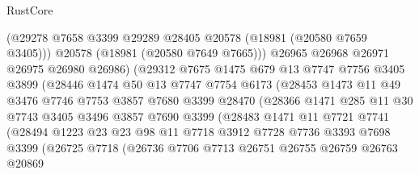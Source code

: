 \begin{lexlean}{RustCore}
\begin{coremodule}
                        (@29278 @7658 @3399 @29289 @28405 @20578 (@18981 (@20580 @7659 @3405)))
                        @20578
                        (@18981 (@20580 @7649 @7665)))
                      @26965
                      @26968
                      @26971
                      @26975
                      @26980
                      @26986)
                    (@29312
                      @7675
                      @1475
                      @679
                      @13
                      @7747
                      @7756
                      @3405
                      @3899
                      (@28446
                        @1474
                        @50
                        @13
                        @7747
                        @7754
                        @6173
                        (@28453
                          @1473
                          @11
                          @49
                          @3476
                          @7746
                          @7753
                          @3857
                          @7680
                          @3399
                          @28470
                          (@28366
                            @1471
                            @285
                            @11
                            @30
                            @7743
                            @3405
                            @3496
                            @3857
                            @7690
                            @3399
                            (@28483
                              @1471
                              @11
                              @7721
                              @7741
                              (@28494
                                @1223
                                @23
                                @23
                                @98
                                @11
                                @7718
                                @3912
                                @7728
                                @7736
                                @3393
                                @7698
                                @3399
                                (@26725
                                  @7718
                                  (@26736
                                    @7706
                                    @7713
                                    @26751
                                    @26755
                                    @26759
                                    @26763
                                    @20869

\end{coremodule}
\end{lexlean}
